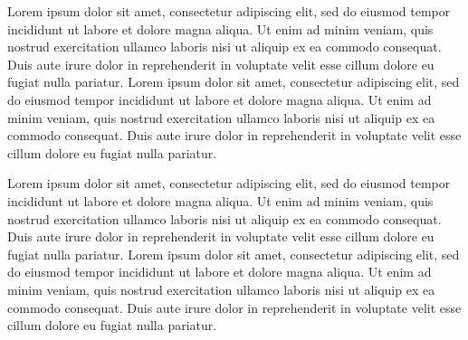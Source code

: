 \documentclass{book}
\begin{document}
Lorem ipsum dolor sit amet, consectetur adipiscing elit, sed do eiusmod tempor incididunt ut labore et dolore magna aliqua. Ut enim ad minim veniam, quis nostrud exercitation ullamco laboris nisi ut aliquip ex ea commodo consequat. Duis aute irure dolor in reprehenderit in voluptate velit esse cillum dolore eu fugiat nulla pariatur. Lorem ipsum dolor sit amet, consectetur adipiscing elit, sed do eiusmod tempor incididunt ut labore et dolore magna aliqua. Ut enim ad minim veniam, quis nostrud exercitation ullamco laboris nisi ut aliquip ex ea commodo consequat. Duis aute irure dolor in reprehenderit in voluptate velit esse cillum dolore eu fugiat nulla pariatur.

Lorem ipsum dolor sit amet, consectetur adipiscing elit, sed do eiusmod tempor incididunt ut labore et dolore magna aliqua. Ut enim ad minim veniam, quis nostrud exercitation ullamco laboris nisi ut aliquip ex ea commodo consequat. Duis aute irure dolor in reprehenderit in voluptate velit esse cillum dolore eu fugiat nulla pariatur. Lorem ipsum dolor sit amet, consectetur adipiscing elit, sed do eiusmod tempor incididunt ut labore et dolore magna aliqua. Ut enim ad minim veniam, quis nostrud exercitation ullamco laboris nisi ut aliquip ex ea commodo consequat. Duis aute irure dolor in reprehenderit in voluptate velit esse cillum dolore eu fugiat nulla pariatur.
\end{document}
